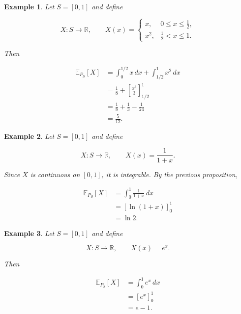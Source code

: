 \documentclass[10pt,a4paper]{book}
\newtheorem{example}{Example}[section]
\begin{document}
\begin{example}

    Let $S=[0,1]$ and define

    $$
        X:S\to\mathbb R,
        \qquad
        X(x)=
        \begin{cases}
            x,   & 0\leq x\leq\frac12, \\
            x^2, & \frac12<x\leq1.
        \end{cases}
    $$

    Then

    $$
        \begin{aligned}
            \mathbb E_{P_S}[X]
             & =
            \int_0^{1/2}x\,dx
            +
            \int_{1/2}^1x^2\,dx \\
             & =
            \frac18+
            \left[
                \frac{x^3}{3}
                \right]_{1/2}^1 \\
             & =
            \frac18+
            \frac13-\frac1{24}  \\
             & =
            \frac5{12}.
        \end{aligned}
    $$

\end{example}

\begin{example}

    Let $S=[0,1]$ and define

    $$
        X:S\to\mathbb R,
        \qquad
        X(x)=\frac{1}{1+x}.
    $$

    Since $X$ is continuous on $[0,1]$, it is integrable. By the previous proposition,

    $$
        \begin{aligned}
            \mathbb E_{P_S}[X]
             & =
            \int_0^1\frac{1}{1+x}\,dx \\
             & =
            \left[\ln(1+x)\right]_0^1 \\
             & =
            \ln 2.
        \end{aligned}
    $$

\end{example}

\begin{example}

    Let $S=[0,1]$ and define

    $$
        X:S\to\mathbb R,
        \qquad
        X(x)=e^x.
    $$

    Then

    $$
        \begin{aligned}
            \mathbb E_{P_S}[X]
             & =
            \int_0^1e^x\,dx      \\
             & =
            \left[e^x\right]_0^1 \\
             & =
            e-1.
        \end{aligned}
    $$

\end{example}
\end{document}
